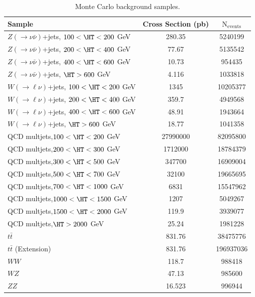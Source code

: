 \begin{table}[!ht]
\small
\begin{center}
\caption{Monte Carlo background samples.}
\label{tab:backgroundsamples}
\begin{tabular}{lcc} \hline
Sample & Cross Section (pb) & $\text{N}_{\text{events}}$ \\ \hline
$Z(\rightarrow \nu \bar{\nu})$+jets, $100 < \HT < 200$ GeV & 280.35 & 5240199 \\
$Z(\rightarrow \nu \bar{\nu})$+jets, $200 < \HT < 400$ GeV & 77.67 & 5135542 \\
$Z(\rightarrow \nu \bar{\nu})$+jets, $400 < \HT < 600$ GeV  & 10.73 & 954435  \\
$Z(\rightarrow \nu \bar{\nu})$+jets, $\HT > 600$ GeV & 4.116 & 1033818 \\ \hline
$W(\rightarrow \ell \nu)$+jets, $100 < \HT < 200$ GeV & 1345 & 10205377  \\
$W(\rightarrow \ell \nu)$+jets, $200 < \HT < 400$ GeV & 359.7  & 4949568  \\
$W(\rightarrow \ell \nu)$+jets, $400 < \HT < 600$ GeV & 48.91 & 1943664  \\
$W(\rightarrow \ell \nu)$+jets, $\HT > 600$ GeV & 18.77 & 1041358  \\ \hline
QCD multjets,$100 < \HT < 200$ GeV & 27990000  & 82095800 \\
QCD multjets,$200 < \HT < 300$ GeV & 1712000 & 18784379 \\
QCD multjets,$300 < \HT < 500$ GeV & 347700 & 16909004  \\
QCD multjets,$500 < \HT < 700$ GeV & 32100  & 19665695  \\
QCD multjets,$700 < \HT < 1000$ GeV& 6831  & 15547962 \\
QCD multjets,$1000 < \HT < 1500$ GeV & 1207 & 5049267 \\
QCD multjets,$1500 < \HT < 2000$ GeV & 119.9 & 3939077  \\
QCD multjets,$ \HT > 2000$ GeV & 25.24 & 1981228 \\ \hline
$t\bar{t}$ & 831.76 & 38475776 \\ 
$t\bar{t}$ (Extension) & 831.76 & 196937036 \\ \hline
$WW$ & 118.7 & 988418 \\
$WZ$ & 47.13  & 985600    \\
$ZZ$ & 16.523 & 996944 \\ \hline
\end{tabular}
\end{center}
\end{table}

